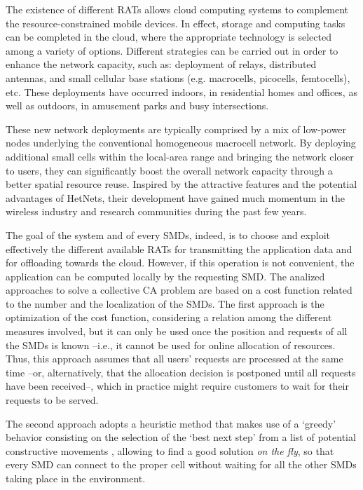 \documentclass[twoside,openright]{report}
\begin{document}
The existence of different \glspl{RAT} allows cloud computing systems to complement the resource-constrained mobile devices. 
In effect, storage and computing tasks can be completed in the cloud, where the appropriate technology is selected among a variety of options.
Different strategies can be carried out in order to enhance the network capacity, such as: deployment of relays, distributed antennas, and small cellular base stations (e.g. macrocells, picocells, femtocells), etc. 
These deployments have occurred indoors, in residential homes and offices, as well as outdoors, in amusement parks and busy intersections.

These new network deployments are typically comprised by a mix of low-power nodes underlying the conventional homogeneous macrocell network. 
By deploying additional small cells within the local-area range and bringing the network closer to users, they can significantly boost the overall network capacity through a better spatial resource reuse.
Inspired by the attractive features and the potential advantages of \glspl{HetNet}, their development have gained much momentum in the wireless industry and research communities during the past few years.

The goal of the system and of every \glspl{SMD}, indeed, is to choose and exploit effectively the different available \glspl{RAT} for transmitting the application data and for offloading towards the cloud. 
However, if this operation is not convenient, the application can be computed locally by the requesting \gls{SMD}.
The analized approaches to solve a collective \gls{CA} problem are based on a cost function related to the number and the localization of the \glspl{SMD}.
The first approach is the optimization of the cost function, considering a relation among the different measures involved, but it can only be used once the position and requests of all the \glspl{SMD} is known --i.e., it cannot be used for online allocation of resources. 
Thus, this approach assumes that all users' requests are processed at the same time --or, alternatively, that the allocation decision is postponed until all requests have been received--, which in practice might require customers to wait for their requests to be served. 

The second approach adopts a heuristic method that makes use of a `greedy' behavior consisting on the selection of the `best next step' from a list of potential constructive movements \cite{Globecom2014}, allowing to find a good solution \emph{on the fly}, so that every SMD can connect to the proper cell without waiting for all the other SMDs taking place in the environment.
\end{document}
